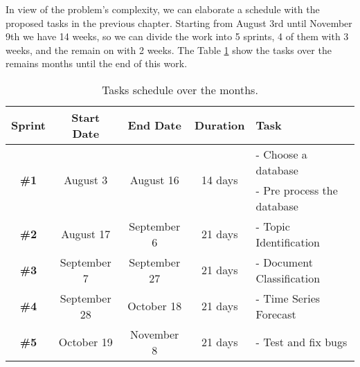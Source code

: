 In view of the problem's complexity, we can elaborate a schedule with the proposed tasks in the previous chapter. Starting from August 3rd until November 9th we have 14 weeks, so we can divide the work into 5 sprints, 4 of them with 3 weeks, and the remain on with 2 weeks. The Table \ref{tab:roadmap-table} show the tasks over the remains months until the end of this work.

\begin{table}[h!]
	\centering
	\caption{Tasks schedule over the months.}
	\label{tab:roadmap-table}
	\begin{tabular}{c|cccl}
		\hline
		       \textbf{Sprint}        &    \textbf{Start Date}    &     \textbf{End Date}      &    \textbf{Duration}     & \textbf{Task}              \\ \hline
		\multirow{2}{*}{\textbf{\#1}} & \multirow{2}{*}{August 3} & \multirow{2}{*}{August 16} & \multirow{2}{*}{14 days} & - Choose a database         \\
		                              &                           &                            &                          & - Pre process the database \\
		        \textbf{\#2}          &         August 17         &        September 6         &         21 days          & - Topic Identification     \\
		        \textbf{\#3}          &        September 7        &        September 27        &         21 days          & - Document Classification  \\
		        \textbf{\#4}          &       September 28        &         October 18         &         21 days          & - Time Series Forecast     \\
		        \textbf{\#5}          &        October 19         &         November 8         &         21 days          & - Test and fix bugs        \\ \hline
	\end{tabular}
\end{table}